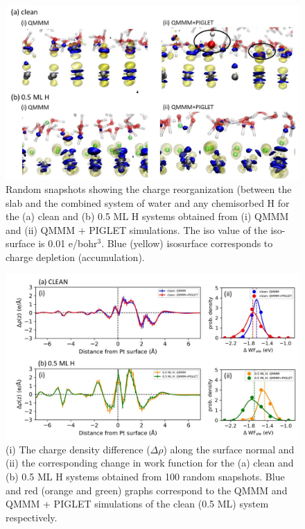 \begin{figure}
   \begin{center}
    \includegraphics[width=15cm]{./Chapter3/figures/slide11.JPG}       
   \end{center}
    \caption{Random snapshots showing the charge reorganization (between the slab and the combined system of water and any chemisorbed H for the (a) clean and (b) 0.5 ML H systems obtained from (i) QMMM and (ii) QMMM $+$ PIGLET simulations. The iso value of the iso-surface is 0.01 e/bohr$^3$. Blue (yellow) isosurface corresponds to charge depletion (accumulation).}
  \label{fig:Slide11}
\end{figure}

\begin{figure}
   \begin{center}
    \includegraphics[width=16cm]{./Chapter3/figures/Slide5.JPG}       
   \end{center}
    \caption{(i) The charge density difference ($\Delta\rho$) along the surface normal and (ii) the corresponding change in work function for the (a) clean and (b) 0.5 ML H systems obtained from 100 random snapshots. Blue and red (orange and green) graphs correspond to the QMMM and QMMM + PIGLET simulations of the clean (0.5 ML) system respectively.}
  \label{fig:Slide5}
\end{figure}

